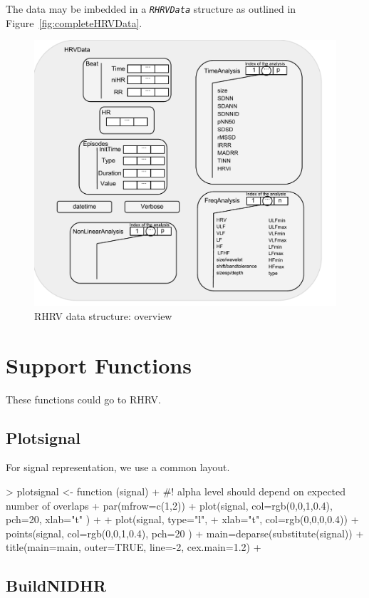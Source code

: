\documentclass[a4paper, english, utf8]{amsart}
\newcommand{\figref}[1]{Figure\ \vref{#1}}
\newcommand\code[1]{\textsl{\texttt{#1}}}
\begin{document}
The data may be imbedded in a \code{RHRVData} structure as outlined in \figref{fig:completeHRVData}.


\begin{figure}[htbp]
\begin{center}
\includegraphics[width=0.8\linewidth]{../media/completeHRVData}
\caption{RHRV data structure: overview}
\label{fig:completeHRVData}
\end{center}
\end{figure}


\section{Support Functions}

These functions could go to RHRV.

\subsection{Plotsignal}
For signal representation, we use a common layout.
\begin{Schunk}
\begin{Sinput}
> plotsignal <- function (signal) {
+ #! alpha level should depend on expected number of overlaps
+ par(mfrow=c(1,2))
+ plot(signal, col=rgb(0,0,1,0.4), pch=20, xlab="t" )
+ 
+ plot(signal, type="l", 
+ 	 xlab="t", col=rgb(0,0,0,0.4))
+ points(signal, col=rgb(0,0,1,0.4), pch=20 )
+ main=deparse(substitute(signal))
+ title(main=main, outer=TRUE, line=-2, cex.main=1.2)
+ }
\end{Sinput}
\end{Schunk}
\subsection{BuildNIDHR}
\end{document}
